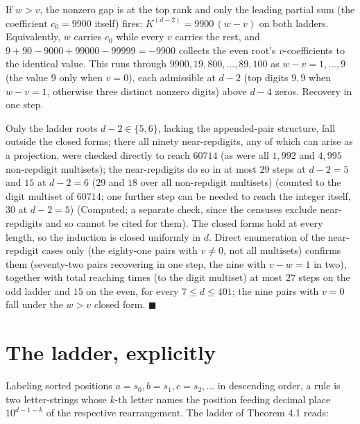 \documentclass[11pt,letterpaper]{article}
\theoremstyle{paperstyle}
\theoremstyle{paperstyledef}
\theoremstyle{paperstylerem}
\begin{document}
If \(w > v\), the nonzero gap is at the top rank and only the leading partial sum (the coefficient \(c_0 = 9900\) itself) fires: \(K^{(d-2)} = 9900\,(w-v)\) on both ladders. Equivalently, \(w\) carries \(c_0\) while every \(v\) carries the rest, and \(9 + 90 - 9000 + 99000 - 99999 = -9900\) collects the even root's \(v\)-coefficients to the identical value. This runs through \(9900, 19{,}800, \dots, 89{,}100\) as \(w - v = 1, \dots, 9\) (the value \(9\) only when \(v = 0\)), each admissible at \(d-2\) (top digits \(9,9\) when \(w-v=1\), otherwise three distinct nonzero digits) above \(d-4\) zeros. Recovery in one step.

Only the ladder roots \(d - 2 \in \{5, 6\}\), lacking the appended-pair structure, fall outside the closed forms; there all ninety near-repdigits, any of which can arise as a projection, were checked directly to reach \(60714\) (as were all \(1{,}992\) and \(4{,}995\) non-repdigit multisets); the near-repdigits do so in at most \(29\) steps at \(d-2 = 5\) and \(15\) at \(d-2 = 6\) (\(29\) and \(18\) over all non-repdigit multisets) (counted to the digit multiset of \(60714\); one further step can be needed to reach the integer itself, \(30\) at \(d-2 = 5\)) (Computed; a separate check, since the censuses exclude near-repdigits and so cannot be cited for them). The closed forms hold at every length, so the induction is closed uniformly in \(d\). Direct enumeration of the near-repdigit cases only (the eighty-one pairs with \(v \neq 0\), not all multisets) confirms them (seventy-two pairs recovering in one step, the nine with \(v - w = 1\) in two), together with total reaching times (to the digit multiset) at most \(27\) steps on the odd ladder and \(15\) on the even, for every \(7 \leq d \leq 401\); the nine pairs with \(v = 0\) fall under the \(w > v\) closed form. \(\blacksquare\)

\section{The ladder, explicitly}\label{the-ladder-explicitly}

Labeling sorted positions \(a = s_0, b = s_1, c = s_2, \dots\) in descending order, a rule is two letter-strings whose \(k\)-th letter names the position feeding decimal place \(10^{d-1-k}\) of the respective rearrangement. The ladder of Theorem 4.1 reads:
\end{document}
